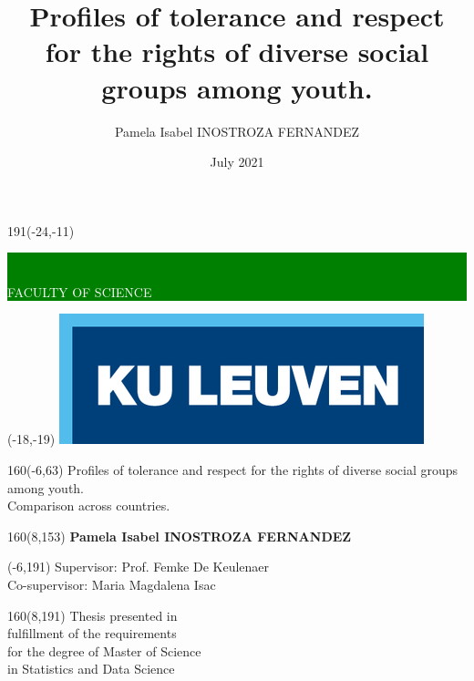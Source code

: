 \documentclass[12pt,a4paper,oneside]{reedthesis}
\title{Profiles of tolerance and respect for the rights of diverse social groups among youth.}
\author{Pamela Isabel INOSTROZA FERNANDEZ}
\date{July 2021}
\institute{Leuven Statistics Research Centre}
\begin{document}
\thispagestyle{empty}
\newcommand{\form}[1]{\scalebox{1.087}{\boldmath{#1}}}
\sffamily
%
\begin{textblock}{191}(-24,-11)
\colorbox{green}{\hspace{139mm}\ \parbox[c][18truemm]{52mm}{\textcolor{white}{FACULTY OF SCIENCE}}}
\end{textblock}
%
\begin{textblock}{70}(-18,-19)
\textblockcolour{}
\includegraphics*[height=19.8truemm]{LogoKULeuven}
\end{textblock}
%
\begin{textblock}{160}(-6,63)
\textblockcolour{}
\vspace{-\parskip}
\flushleft
\fontsize{40}{42}\selectfont \textcolor{bluetitle}{Profiles of tolerance and respect for the rights of diverse social groups among youth.}\\[1.5mm]
\fontsize{20}{22}\selectfont Comparison across countries.
\end{textblock}
%
\begin{textblock}{160}(8,153)
\textblockcolour{}
\vspace{-\parskip}
\flushright
\fontsize{14}{16}\selectfont \textbf{Pamela Isabel INOSTROZA FERNANDEZ}
\end{textblock}
%
\begin{textblock}{70}(-6,191)
\textblockcolour{}
\vspace{-\parskip}
\flushleft
Supervisor: Prof. Femke De Keulenaer\\[-2pt]
Co-supervisor: Maria Magdalena Isac\\[-2pt]
\end{textblock}
%
\begin{textblock}{160}(8,191)
\textblockcolour{}
\vspace{-\parskip}
\flushright
Thesis presented in\\[4.5pt]
fulfillment of the requirements\\[4.5pt]
for the degree of Master of Science\\[4.5pt]
in Statistics and Data Science\\
\end{textblock}
\end{document}
